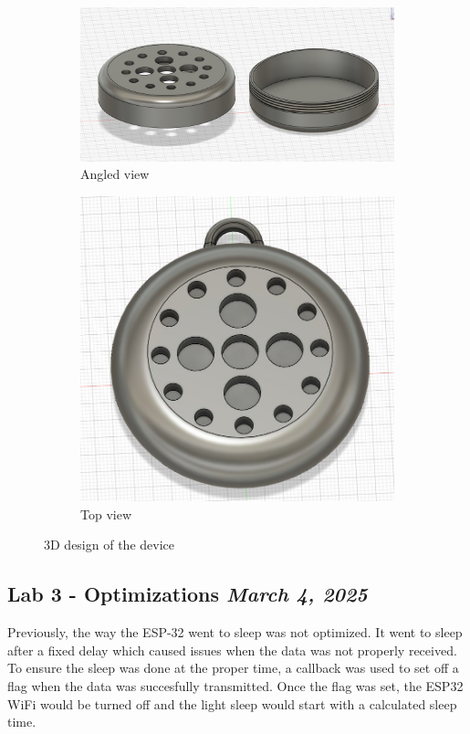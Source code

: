 \documentclass{article}
\newcommand{\logbookentry}[2]{
    \subsection*{#1 \hfill \textit{#2}} 
}
\begin{document}
\begin{figure}[ht!]
    \centering
    \begin{subfigure}[b]{0.45\textwidth}
        \includegraphics[width=\textwidth]{3d_design.png}
        \caption{Angled view}
    \end{subfigure}
    \begin{subfigure}[b]{0.30\textwidth}
        \includegraphics[width=\textwidth]{3d_design_2.png}
        \caption{Top view}
    \end{subfigure}
    \caption{3D design of the device}
    \label{fig:3d_design}
\end{figure}


\logbookentry{Lab 3 - Optimizations}{March 4, 2025}
Previously, the way the ESP-32 went to sleep was not optimized. It went to sleep after a fixed delay which caused issues when the data was not properly received. To ensure the sleep was done at the proper time, a callback was used to set off a flag when the data was succesfully transmitted. Once the flag was set, the ESP32 WiFi would be turned off and the light sleep would start with a calculated sleep time.
\end{document}
